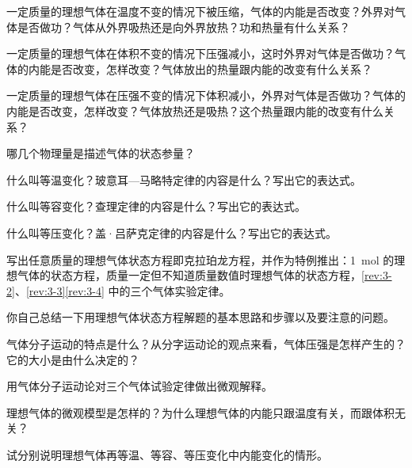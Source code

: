 \begin{Practice}
\begin{question}
	\item 一定质量的理想气体在温度不变的情况下被压缩，气体的内能是否改变？外界对气体是否做功？气体从外界吸热还是向外界放热？功和热量有什么关系？
\item 一定质量的理想气体在体积不变的情况下压强减小，这时外界对气体是否做功？气体的内能是否改变，怎样改变？气体放出的热量跟内能的改变有什么关系？
\item 一定质量的理想气体在压强不变的情况下体积减小，外界对气体是否做功？气体的内能是否改变，怎样改变？气体放热还是吸热？这个热量跟内能的改变有什么关系？
\end{question}
\end{Practice}

\begin{Review}
	\begin{question}
		\item 哪几个物理量是描述气体的状态参量？
		\item\label{rev:3-2} 什么叫等温变化？玻意耳—马略特定律的内容是什么？写出它的表达式。
		\item\label{rev:3-3} 什么叫等容变化？查理定律的内容是什么？写出它的表达式。
		\item\label{rev:3-4} 什么叫等压变化？盖·吕萨克定律的内容是什么？写出它的表达式。
		\item 写出任意质量的理想气体状态方程即克拉珀龙方程，并作为特例推出：\qty{1}{mol} 的理想气体的状态方程，质量一定但不知道质量数值时理想气体的状态方程，\ref{rev:3-2}、\ref{rev:3-3}\ref{rev:3-4} 中的三个气体实验定律。
		\item 你自己总结一下用理想气体状态方程解题的基本思路和步骤以及要注意的问题。
		\item 气体分子运动的特点是什么？从分字运动论的观点来看，气体压强是怎样产生的？它的大小是由什么决定的？
		\item 用气体分子运动论对三个气体试验定律做出微观解释。
		\item 理想气体的微观模型是怎样的？为什么理想气体的内能只跟温度有关，而跟体积无关？
		\item 试分别说明理想气体再等温、等容、等压变化中内能变化的情形。
	\end{question}
\end{Review}

